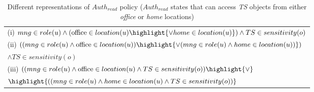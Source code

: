 

 
\begin{table}
	\centering
	\caption{ Different representations of  $Auth_{read}$ policy  ($Auth_{read}$ states that \textit{\manager} can access \textit{TS} objects  from either \textit{office} or \textit{home} locations)} 

	
	\label{tab:LAP-heterogeneity}
	\begin{tabular}{|l|}						
		\hline					
			
			(i) $  \manager \in role(u) \land (\office{} \in location(u) \highlight {\lor home \in location(u)})  \land TS \in sensitivity(o)$ \\
			(ii) $((\manager \in role(u) \land \office{} \in location(u) ) \highlight {\lor (\manager \in role(u) \land home \in location(u) )}  )$ \\ \hfill $ \land TS \in sensitivity(o)$\\
			(iii) $((\manager \in role(u) \land \office{} \in location(u) \land TS \in sensitivity(o) ) \highlight{\lor}$  \\ \hfill $\highlight{((\manager \in role(u) \land home \in location(u) \land TS \in sensitivity(o) )}$ \\
		 \hline	
	\end{tabular}	

	
\end{table}
